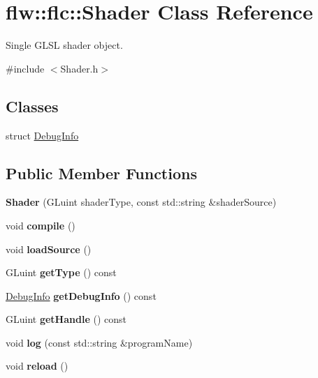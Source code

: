 \hypertarget{classflw_1_1flc_1_1Shader}{}\section{flw\+:\+:flc\+:\+:Shader Class Reference}
\label{classflw_1_1flc_1_1Shader}


Single G\+L\+SL shader object.  




{\ttfamily \#include $<$Shader.\+h$>$}

\subsection*{Classes}
\begin{DoxyCompactItemize}
\item 
struct \hyperlink{structflw_1_1flc_1_1Shader_1_1DebugInfo}{Debug\+Info}
\end{DoxyCompactItemize}
\subsection*{Public Member Functions}
\begin{DoxyCompactItemize}
\item 
\mbox{\label{classflw_1_1flc_1_1Shader_ac65c0360585de4f962ddf7acf6285d3a}} 
{\bfseries Shader} (G\+Luint shader\+Type, const std\+::string \&shader\+Source)
\item 
\mbox{\label{classflw_1_1flc_1_1Shader_aaf7d1de52102c20544704c380582898d}} 
void {\bfseries compile} ()
\item 
\mbox{\label{classflw_1_1flc_1_1Shader_a2909d6d3bcff34f8a5b87736b9ca8633}} 
void {\bfseries load\+Source} ()
\item 
\mbox{\label{classflw_1_1flc_1_1Shader_a5461712a1cb1350b3aab82e4616aca1a}} 
G\+Luint {\bfseries get\+Type} () const
\item 
\mbox{\label{classflw_1_1flc_1_1Shader_acf34c582a8950b2ca8acd7ee84100a7d}} 
\hyperlink{structflw_1_1flc_1_1Shader_1_1DebugInfo}{Debug\+Info} {\bfseries get\+Debug\+Info} () const
\item 
\mbox{\label{classflw_1_1flc_1_1Shader_a8b79f121d3dd74aec8b71fd7f464b721}} 
G\+Luint {\bfseries get\+Handle} () const
\item 
\mbox{\label{classflw_1_1flc_1_1Shader_aa3ff053e3a4f3cf53b7c2ce9a4d95ebc}} 
void {\bfseries log} (const std\+::string \&program\+Name)
\item 
\mbox{\label{classflw_1_1flc_1_1Shader_a5490ecfb46c5cd481100f6d43b77197e}} 
void {\bfseries reload} ()
\end{DoxyCompactItemize}


